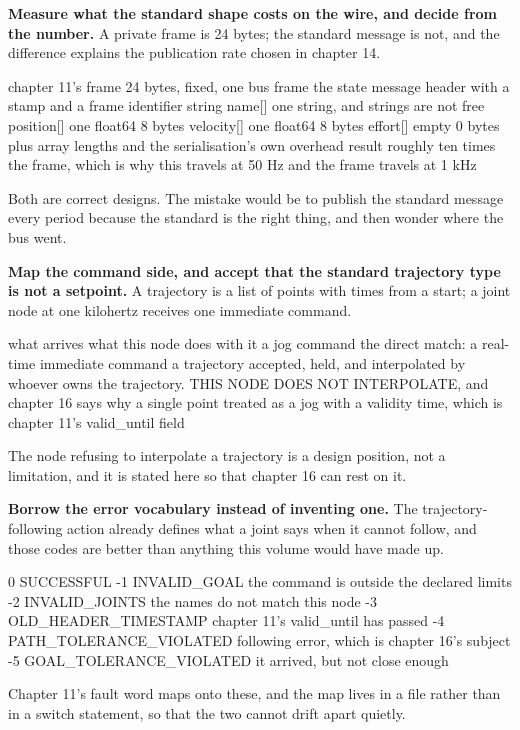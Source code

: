 \begin{steps}
\item \textbf{Measure what the standard shape costs on the wire, and decide from
the number.} A private frame is 24 bytes; the standard message is not, and the
difference explains the publication rate chosen in chapter 14.
\begin{plaincode}
chapter 11's frame     24 bytes, fixed, one bus frame
the state message      header with a stamp and a frame identifier string
                       name[]      one string, and strings are not free
                       position[]  one float64        8 bytes
                       velocity[]  one float64        8 bytes
                       effort[]    empty              0 bytes
                       plus array lengths and the serialisation's own overhead
result                 roughly ten times the frame, which is why this travels
                       at 50 Hz and the frame travels at 1 kHz
\end{plaincode}
Both are correct designs. The mistake would be to publish the standard message
every period because the standard is the right thing, and then wonder where the
bus went.

\item \textbf{Map the command side, and accept that the standard trajectory type
is not a setpoint.} A trajectory is a list of points with times from a start; a
joint node at one kilohertz receives one immediate command.
\begin{plaincode}
what arrives                    what this node does with it
a jog command                   the direct match: a real-time immediate command
a trajectory                    accepted, held, and interpolated by whoever
                                owns the trajectory. THIS NODE DOES NOT
                                INTERPOLATE, and chapter 16 says why
a single point                  treated as a jog with a validity time,
                                which is chapter 11's valid_until field
\end{plaincode}
The node refusing to interpolate a trajectory is a design position, not a
limitation, and it is stated here so that chapter 16 can rest on it.

\item \textbf{Borrow the error vocabulary instead of inventing one.} The
trajectory-following action already defines what a joint says when it cannot
follow, and those codes are better than anything this volume would have made up.
\begin{plaincode}
 0  SUCCESSFUL
-1  INVALID_GOAL              the command is outside the declared limits
-2  INVALID_JOINTS            the names do not match this node
-3  OLD_HEADER_TIMESTAMP      chapter 11's valid_until has passed
-4  PATH_TOLERANCE_VIOLATED   following error, which is chapter 16's subject
-5  GOAL_TOLERANCE_VIOLATED   it arrived, but not close enough
\end{plaincode}
Chapter 11's fault word maps onto these, and the map lives in a file rather than
in a switch statement, so that the two cannot drift apart quietly.


\end{steps}
